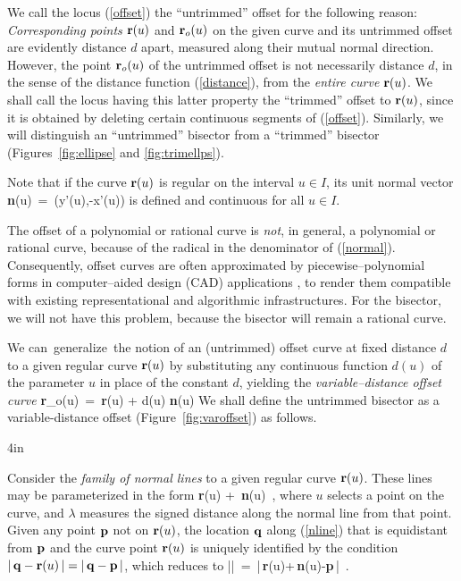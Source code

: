 We call the locus (\ref{offset}) the ``untrimmed'' offset for the
following reason: {\it Corresponding points\/} ${\bf r}(u)$ and
${\bf r}_o(u)$ on the given curve and its untrimmed offset are
evidently distance $d$ apart, measured along their mutual normal
direction. However, the point ${\bf r}_o(u)$ of the untrimmed offset
is not necessarily distance $d$, in the sense of the distance function
(\ref{distance}), from the {\it entire curve\/} ${\bf r}(u)$. We shall
call the locus having this latter property the ``trimmed'' offset to
${\bf r}(u)$, since it is obtained by deleting certain continuous
segments of (\ref{offset}).
Similarly, we will distinguish an ``untrimmed'' bisector from 
a ``trimmed'' bisector (Figures~\ref{fig:ellipse} and \ref{fig:trimellps}).

Note that if the curve ${\bf r}(u)$ is regular on the
interval $u \in I$, its unit normal vector
\be \label{normal}
{\bf n}(u) \,=\, {(y'(u),-x'(u)) \over {}}
\ee
is defined and continuous for all $u \in I$.

The offset of a polynomial or rational curve 
is {\it not}, in general, a polynomial or rational curve, 
because of the radical in the denominator of (\ref{normal}).
Consequently, offset curves are often approximated
by piecewise--polynomial forms in computer--aided design (CAD)
applications \cite{hoschek88,klass83,pham88,tiller84}, to render
them compatible with existing representational and algorithmic
infrastructures. 
For the bisector, we will not have this problem, because the bisector
will remain a rational curve.

We \mbox{can generalize the} notion of an (untrimmed) offset curve at fixed
distance $d$ to a given regular curve ${\bf r}(u)$ by substituting
any continuous function $d(u)$ of the parameter $u$ in place of the
constant $d$, yielding the {\it variable--distance
offset curve}
\be \label{varoffset}
{\bf r}_o(u) \,=\, {\bf r}(u) + d(u) {\bf n}(u)
\ee
We shall define the untrimmed bisector as a variable-distance offset
(Figure~\ref{fig:varoffset}) as follows.

{4in} %

Consider the {\it family of normal lines\/} to a given regular curve
${\bf r}(u)$. These lines may be parameterized in the form
\be \label{nline}
{\bf r}(u) + \lambda\,{\bf n}(u) \,,
\ee
where $u$ selects a point on the curve, and $\lambda$ measures the
signed distance along the normal line from that point. Given any point
${\bf p}$ not on ${\bf r}(u)$, the location ${\bf q}$
along (\ref{nline}) that is equidistant from ${\bf p}$ and
the curve point ${\bf r}(u)$ is uniquely identified by the condition
$|\,{\bf q}-{\bf r}(u)\,|=|\,{\bf q}-{\bf p}\,|$, which reduces to
\be \label{lambda}
|\lambda| \,=\, |\,{\bf r}(u)+\lambda\,{\bf n}(u)-{\bf p}\,| \,.
\ee

